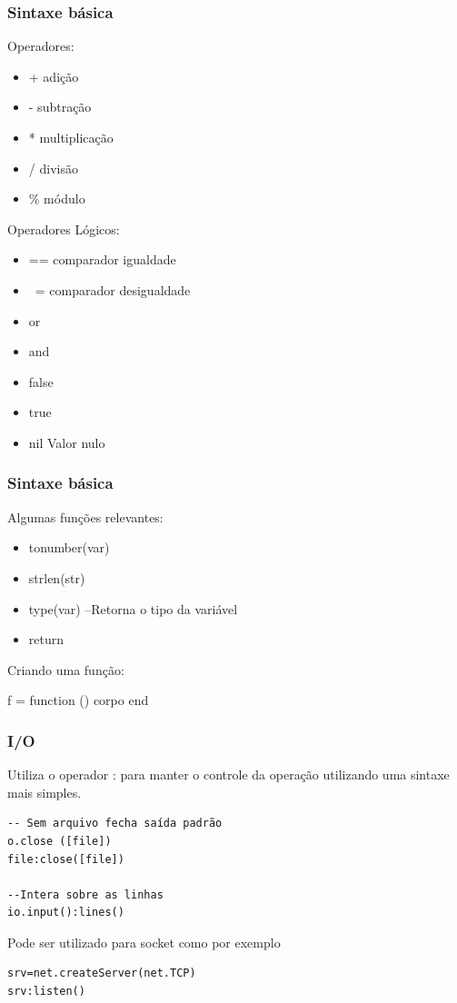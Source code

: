 \documentclass{beamer}
\begin{document}
\begin{frame}[fragile]
\frametitle{Sintaxe básica}

Operadores:

\begin{itemize}
\item + adição  
\item - subtração
\item * multiplicação
\item / divisão
\item \% módulo
\end{itemize}


Operadores Lógicos:
\begin{itemize}
\item == comparador igualdade  
\item ~= comparador desigualdade
\item or 
\item and 
\item false 
\item true
\item nil Valor nulo
\end{itemize}

\end{frame}

\begin{frame}[fragile]
\frametitle{Sintaxe básica}
Algumas funções relevantes:

\begin{itemize}
\item tonumber(var) 
\item strlen(str)
\item type(var) --Retorna o tipo da variável
\item return 
\end{itemize}

Criando uma função:

f = function () corpo end

\end{frame}



\begin{frame}[fragile]
\frametitle{I/O}
Utiliza o operador : para manter o controle da operação utilizando uma sintaxe
mais simples.

\begin{lstlisting}
-- Sem arquivo fecha saída padrão
o.close ([file])
file:close([file])

--Intera sobre as linhas
io.input():lines()
\end{lstlisting}

Pode ser utilizado para socket como por exemplo 

\begin{lstlisting}
srv=net.createServer(net.TCP)
srv:listen()
\end{lstlisting}

\end{frame}
\end{document}

